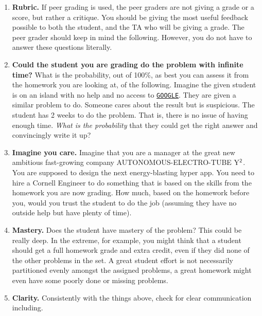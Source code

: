 \documentclass[11pt]{article}
\begin{document}
\begin{enumerate}
\item \textbf{Rubric.}  If peer grading is used, the peer graders are not giving a grade or a score, but rather a critique. You should be giving the most useful feedback possible to both the student, and the TA who will be giving a grade. The peer grader should keep in mind the following.  However, you do not have to answer these questions literally.   

\item  \textbf{Could the student you are grading do the problem with infinite time?} What is the probability, out of 100\%,  as best you can assess it from the homework you are looking at, of the following.
Imagine the given student is on an island with no help and no access to \href{https://lmgtfy.com/?q=How+do+I+solve+dynamics+problems}{\color{blue}\small \tt GOOGLE}.
They are given a similar problem to do.  Someone cares about the result but is suspicious.  The student has 2 weeks to do the problem. That is, there is no issue of having enough time.  \textit{What is the probability} that they could get the right answer and convincingly write it up? 

\item  \textbf{Imagine you care.}  Imagine that you are a manager at the great new ambitious fast-growing company \textsf{AUTONOMOUS-ELECTRO-TUBE Y$^{\sf 2}$}. You are supposed to design the next  energy-blasting hyper app.  You need to hire a Cornell Engineer to do something that is based on the skills from the  homework you are now grading.  How much, based on the homework before you, would you trust the student to do the job (assuming they have no outside help but have plenty of  time).

\item  \textbf{Mastery.} Does the student have mastery of the problem?  This could be really  deep.  In the extreme, for example,  you might think that a  student should get a full homework grade and extra credit,  even if they did none of the other problems in the set.   A great student effort is not necessarily partitioned evenly amongst the assigned problems, a great homework might even have some poorly done or missing problems.

\item \textbf{Clarity.}  Consistently with the things above, check for  clear communication including.

\begin{enumerate}


\end{enumerate}
\end{enumerate}
\end{document}
